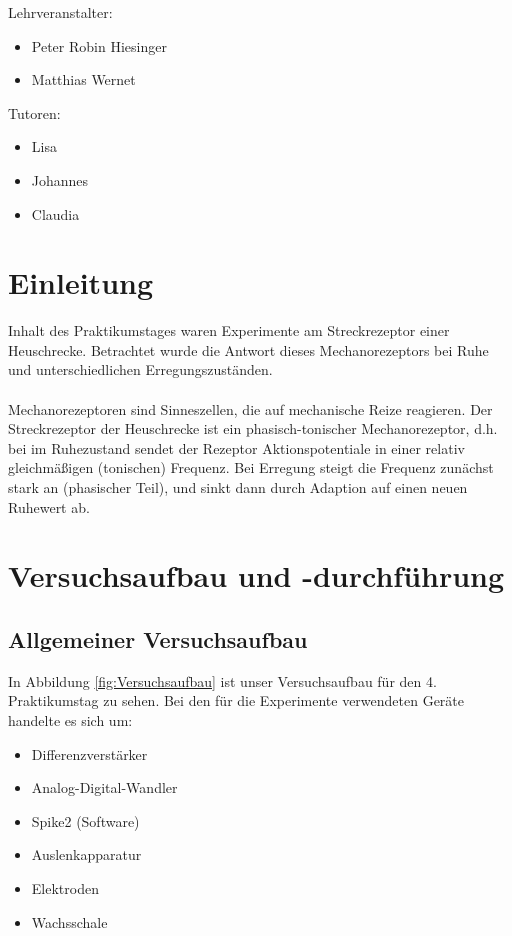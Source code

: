 \documentclass[a4paper]{article}
\begin{document}
\begin{titlepage}
{\LARGE Lehrveranstalter:}
\begin{itemize}
\item  Peter Robin Hiesinger
\item Matthias Wernet
\end{itemize}
\vspace{2.5\baselineskip}

{\LARGE Tutoren:}
\begin{itemize}
\item Lisa
\item Johannes
\item Claudia
\end{itemize}
	
\end{titlepage}


\section{Einleitung}
Inhalt des Praktikumstages waren Experimente am Streckrezeptor einer Heuschrecke. Betrachtet wurde die Antwort dieses Mechanorezeptors bei Ruhe und unterschiedlichen Erregungszuständen.\\ \\
Mechanorezeptoren sind Sinneszellen, die auf mechanische Reize reagieren. Der Streckrezeptor der Heuschrecke ist ein phasisch-tonischer Mechanorezeptor, d.h. bei im Ruhezustand sendet der Rezeptor Aktionspotentiale in einer relativ gleichmäßigen (tonischen)  Frequenz. Bei Erregung steigt die Frequenz zunächst stark an (phasischer Teil), und sinkt dann durch Adaption auf einen neuen Ruhewert ab.


\section{Versuchsaufbau und -durchführung}

\subsection{Allgemeiner Versuchsaufbau}

In Abbildung \ref{fig:Versuchsaufbau} ist unser Versuchsaufbau für den 4. Praktikumstag zu sehen. 
Bei den für die Experimente verwendeten Geräte handelte es sich um:

\begin{itemize}
    \item Differenzverstärker
    \item Analog-Digital-Wandler
    \item Spike2 (Software)
    \item Auslenkapparatur
    \item Elektroden
    \item Wachsschale
\end{itemize}
\end{document}
